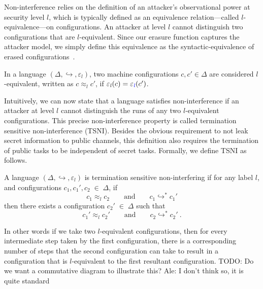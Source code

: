 \documentclass{sigplanconf}
\newcommand{\Varid}[1]{\mathit{#1}}
\newcommand{\Red}[1]{{\color{red} #1}}
\begin{document}
Non-interference relies on the definition of an attacker's observational power at
security level \ensuremath{\Varid{l}}, which is typically defined as an equivalence
relation---called \ensuremath{\Varid{l}}-equivalence---on configurations.  An attacker
at level \ensuremath{\Varid{l}} cannot
distinguish two configurations that are \ensuremath{\Varid{l}}-equivalent.
%
Since our erasure function captures the attacker model, we simply define this
equivalence as the syntactic-equivalence of erased configurations~\cite{stefan:addressing-covert}.
%
\begin{definition}[\ensuremath{\Varid{l}}-equivalence]
    In a language \ensuremath{(\Delta,\hookrightarrow,\varepsilon_{\Varid{l}})}, two machine configurations
    \ensuremath{c,c'\in\Delta} are considered $l$-equivalent, written as \ensuremath{c\approx_lc'},
    if \ensuremath{\varepsilon_{\Varid{l}}(c)\mathrel{=}\varepsilon_{\ifc{\Varid{l}}}(c')}.
\end{definition}
%

Intuitively, we can now state that a language satisfies non-interference if an
attacker at level \ensuremath{\Varid{l}} cannot distinguish the runs of any two \ensuremath{\Varid{l}}-equivalent
configurations.
%
This precise non-interference property is called termination sensitive non-interference
(TSNI).  Besides the obvious requirement to not leak secret information
to public channels, this definition also requires the termination
of public tasks to be independent of secret tasks.
%
Formally, we define TSNI as follows.

\begin{definition}
  A language \ensuremath{(\Delta,\hookrightarrow,\varepsilon_{\Varid{l}})} is termination
  sensitive non-interfering if for any label \ensuremath{\Varid{l}}, and configurations
  \ensuremath{c_{1},c_{1}',c_{2}\;\in\;\Delta}, if
  \begin{equation} \label{eq:tsni-lhs}
    \ensuremath{c_{1}} \approx_{\ensuremath{\Varid{l}}} \ensuremath{c_{2}}
    \qquad \text{and} \qquad
    \ensuremath{c_{1}} \ensuremath{\hookrightarrow}^* \ensuremath{c_{1}'}
  \end{equation}
  then there exists a configuration \ensuremath{c_{2}'\;\in\;\Delta} such that
  \begin{equation} \label{eq:tsni-rhs}
    \ensuremath{c_{1}'} \approx_{\ensuremath{\Varid{l}}} \ensuremath{c_{2}'}
     \qquad \text{and} \qquad
    \ensuremath{c_{2}} \ensuremath{\hookrightarrow}^* \ensuremath{c_{2}'}
    \ \text{.}
  \end{equation}
\end{definition}
%
In other words if we take two \ensuremath{\Varid{l}}-equivalent configurations, then for every
intermediate step taken by the first configuration, there is a corresponding
number of steps that the second configuration can take to result in a
configuration that is \ensuremath{\Varid{l}}-equivalent to the first resultant configuration.
\Red{TODO: Do we want a commutative diagram to illustrate this? Ale: I don't
  think so, it is quite standard}
\end{document}
